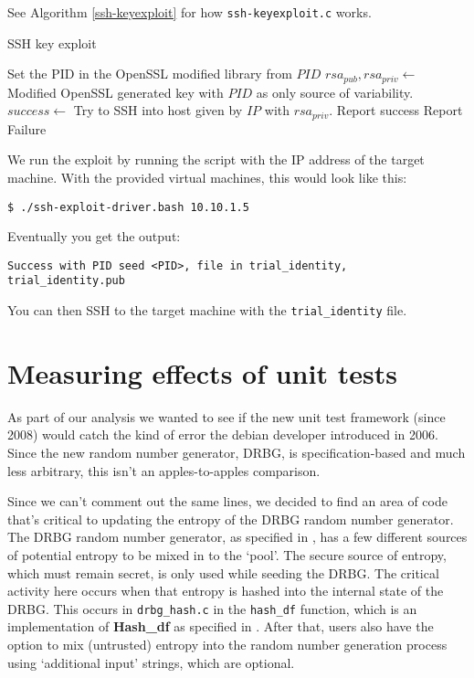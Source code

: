 \documentclass[conference]{IEEEtran}
\begin{document}
See Algorithm \ref{ssh-keyexploit} for how \verb|ssh-keyexploit.c|
works.

\begin{algorithm}
  \caption{SSH key exploit}\label{ssh-keyexploit}

  \begin{algorithmic}[1]
    \State Set the PID in the OpenSSL modified library from $PID$
    \State $rsa_{pub}, rsa_{priv} \gets$ Modified OpenSSL generated key with $PID$ as only source of variability.
    \State $success \gets$ Try to SSH into host given by $IP$ with $rsa_{priv}$.
    \State Report success
    \Else
    \State Report Failure
    \EndIf
    \EndProcedure
  \end{algorithmic}
\end{algorithm}

We run the exploit by running the script with the IP address of the
target machine. With the provided virtual machines, this would look like this:

\begin{verbatim}
$ ./ssh-exploit-driver.bash 10.10.1.5
\end{verbatim}

Eventually you get the output:

\begin{verbatim}
Success with PID seed <PID>, file in trial_identity, trial_identity.pub
\end{verbatim}

You can then SSH to the target machine with the \verb|trial_identity|
file.

\section{Measuring effects of unit tests}
As part of our analysis we wanted to see if the new unit test
framework (since 2008) would catch the kind of error the debian
developer introduced in 2006. Since the new random number generator,
DRBG, is specification-based and much less arbitrary, this isn't an
apples-to-apples comparison.

Since we can't comment out the same lines, we decided to find an area
of code that's critical to updating the entropy of the DRBG random
number generator. The DRBG random number generator, as specified in
\cite{12}, has a few different sources of potential entropy to be
mixed in to the `pool'. The secure source of entropy, which must
remain secret, is only used while seeding the DRBG. The critical
activity here occurs when that entropy is hashed into the internal
state of the DRBG. This occurs in \verb|drbg_hash.c| in the
\verb|hash_df| function, which is an implementation of
\textbf{Hash\_df} as specified in \cite{12}. After that, users also
have the option to mix (untrusted) entropy into the random number
generation process using `additional input' strings, which are
optional.
\end{document}
